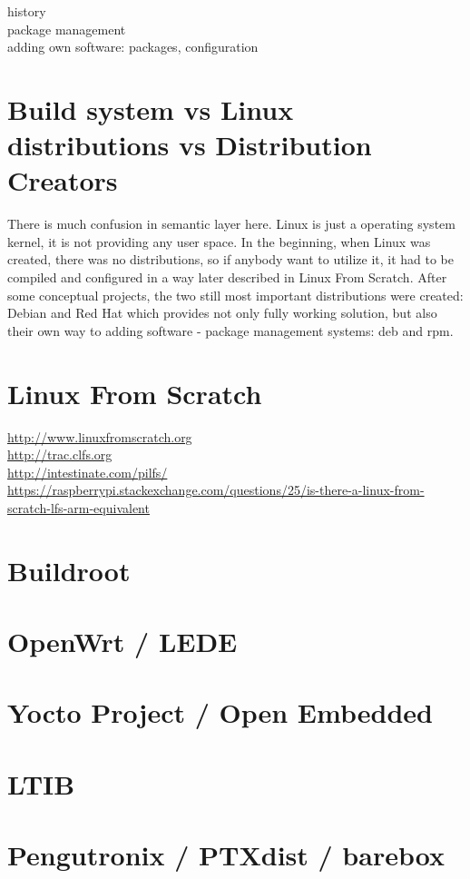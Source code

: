 \documentclass[printmode]{mgr}
\begin{document}
history\\
package management\\
adding own software: packages, configuration\\

\section{Build system vs Linux distributions vs Distribution Creators}
There is much confusion in semantic layer here. Linux is just a operating system kernel, it is not providing any user space.
In the beginning, when Linux was created, there was no distributions, so if anybody want to utilize it, it had to be compiled and configured in a way later described in Linux From Scratch.
After some conceptual projects, the two still most important distributions were created: Debian and Red Hat which provides not only fully working solution, but also their own way to adding software - package management systems: deb and rpm. 

\section{Linux From Scratch}

\url{http://www.linuxfromscratch.org}\\
\url{http://trac.clfs.org}\\
\url{http://intestinate.com/pilfs/}\\
\url{https://raspberrypi.stackexchange.com/questions/25/is-there-a-linux-from-scratch-lfs-arm-equivalent}

\section{Buildroot}

\section{OpenWrt / LEDE}

\section{Yocto Project / Open Embedded}

\section{LTIB}

\section{Pengutronix / PTXdist / barebox}
\end{document}
